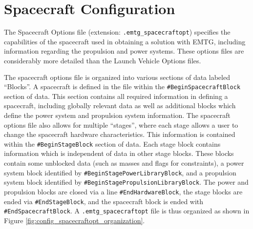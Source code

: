 \section{Spacecraft Configuration}
\label{sec:spacecraft_config}
The Spacecraft Options file (extension: {\tt .emtg\_spacecraftopt}) specifies
the capabilities of the spacecraft used in obtaining a solution with \ac{EMTG}, including information regarding the propulsion and power systems. These options files are considerably more detailed than the Launch Vehicle Options files.

The spacecraft options file is organized into various sections of data labeled ``Blocks''. A spacecraft is defined in the file within the {\tt \#BeginSpacecraftBlock} section of data. This section contains all required information in defining a spacecraft, including globally relevant data as well as additional blocks which define the power system and propulsion system information. The spacecraft options file also allows for multiple ``stages'', where each stage allows a user to change the spacecraft hardware characteristics. This information is contained within the {\tt \#BeginStageBlock} section of data. Each stage block contains information which is independent of data in other stage blocks. These blocks contain some unblocked data (such as masses and flags for constraints), a power system block identified by {\tt \#BeginStagePowerLibraryBlock}, and a propulsion system block identified by {\tt \#BeginStagePropulsionLibraryBlock}. The power and propulsion blocks are closed via a line {\tt \#EndHardwareBlock}, the stage blocks are ended via {\tt \#EndStageBlock}, and the spacecraft block is ended with {\tt \#EndSpacecraftBlock}. A {\tt .emtg\_spacecraftopt} file is thus organized as shown in Figure \ref{fig:config_spacecraftopt_organization}.

